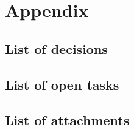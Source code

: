 \documentclass[
  paper=a4,                         %
  fontsize=11pt,                    %
  DIV=12,                           %
  BCOR=10mm,                        %
  twoside=true,                     %
  parskip=half,                     %
  headings=small,                   %
]{scrreprt}                         %
\begin{document}
\appendix
{}
\chapter{Appendix}
\section{List of decisions}\listofdecisions
\section{List of open tasks}\listoftasks
\section{List of attachments}\listofattachments
\end{document}
